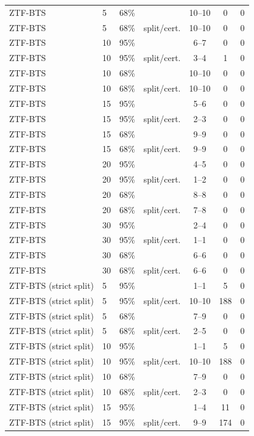 \begin{longtable}{llllccc}
ZTF-BTS & 5 & 68\% & \gamut{} & 10--10 & 0 & 0 \\
ZTF-BTS & 5 & 68\% & split/cert. & 10--10 & 0 & 0 \\
ZTF-BTS & 10 & 95\% & \gamut{} & 6--7 & 0 & 0 \\
ZTF-BTS & 10 & 95\% & split/cert. & 3--4 & 1 & 0 \\
ZTF-BTS & 10 & 68\% & \gamut{} & 10--10 & 0 & 0 \\
ZTF-BTS & 10 & 68\% & split/cert. & 10--10 & 0 & 0 \\
ZTF-BTS & 15 & 95\% & \gamut{} & 5--6 & 0 & 0 \\
ZTF-BTS & 15 & 95\% & split/cert. & 2--3 & 0 & 0 \\
ZTF-BTS & 15 & 68\% & \gamut{} & 9--9 & 0 & 0 \\
ZTF-BTS & 15 & 68\% & split/cert. & 9--9 & 0 & 0 \\
ZTF-BTS & 20 & 95\% & \gamut{} & 4--5 & 0 & 0 \\
ZTF-BTS & 20 & 95\% & split/cert. & 1--2 & 0 & 0 \\
ZTF-BTS & 20 & 68\% & \gamut{} & 8--8 & 0 & 0 \\
ZTF-BTS & 20 & 68\% & split/cert. & 7--8 & 0 & 0 \\
ZTF-BTS & 30 & 95\% & \gamut{} & 2--4 & 0 & 0 \\
ZTF-BTS & 30 & 95\% & split/cert. & 1--1 & 0 & 0 \\
ZTF-BTS & 30 & 68\% & \gamut{} & 6--6 & 0 & 0 \\
ZTF-BTS & 30 & 68\% & split/cert. & 6--6 & 0 & 0 \\
ZTF-BTS (strict split) & 5 & 95\% & \gamut{} & 1--1 & 5 & 0 \\
ZTF-BTS (strict split) & 5 & 95\% & split/cert. & 10--10 & 188 & 0 \\
ZTF-BTS (strict split) & 5 & 68\% & \gamut{} & 7--9 & 0 & 0 \\
ZTF-BTS (strict split) & 5 & 68\% & split/cert. & 2--5 & 0 & 0 \\
ZTF-BTS (strict split) & 10 & 95\% & \gamut{} & 1--1 & 5 & 0 \\
ZTF-BTS (strict split) & 10 & 95\% & split/cert. & 10--10 & 188 & 0 \\
ZTF-BTS (strict split) & 10 & 68\% & \gamut{} & 7--9 & 0 & 0 \\
ZTF-BTS (strict split) & 10 & 68\% & split/cert. & 2--3 & 0 & 0 \\
ZTF-BTS (strict split) & 15 & 95\% & \gamut{} & 1--4 & 11 & 0 \\
ZTF-BTS (strict split) & 15 & 95\% & split/cert. & 9--9 & 174 & 0 \\

\end{longtable}
